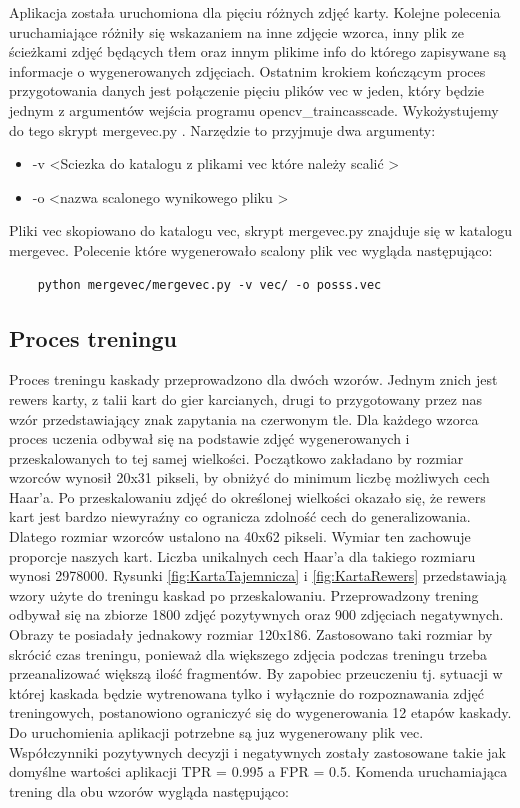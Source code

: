 \documentclass{article}
\numberwithin{equation}{section}
\begin{document}
Aplikacja została uruchomiona dla pięciu różnych zdjęć karty. Kolejne polecenia uruchamiające różniły się wskazaniem na inne zdjęcie wzorca, inny plik ze ścieżkami zdjęć będących tłem oraz innym plikime info do którego zapisywane są informacje o wygenerowanych zdjęciach.
Ostatnim krokiem kończącym proces przygotowania danych jest połączenie pięciu plików vec w jeden, który będzie jednym z argumentów wejścia programu opencv\_traincasscade. Wykożystujemy do tego skrypt mergevec.py \cite{mergeVec}. Narzędzie to przyjmuje dwa argumenty:
\begin{itemize}
    \item -v \textless Sciezka do katalogu z plikami vec które należy scalić \textgreater
    \item -o \textless nazwa scalonego wynikowego pliku \textgreater
\end{itemize}
Pliki vec skopiowano do katalogu vec, skrypt mergevec.py znajduje się w katalogu mergevec. Polecenie które wygenerowało scalony plik vec wygląda następująco: 
\begin{lstlisting}
    python mergevec/mergevec.py -v vec/ -o posss.vec
\end{lstlisting}
\subsection{Proces treningu}

Proces treningu kaskady przeprowadzono dla dwóch wzorów. Jednym znich jest rewers karty, z talii kart do gier karcianych, drugi to przygotowany przez nas wzór przedstawiający znak zapytania na czerwonym tle. Dla każdego wzorca proces uczenia odbywał się na podstawie zdjęć wygenerowanych i przeskalowanych to tej samej wielkości. Początkowo zakładano by rozmiar wzorców wynosił 20x31 pikseli, by obniżyć do minimum liczbę możliwych cech Haar'a.
Po przeskalowaniu zdjęć do określonej wielkości okazało się, że rewers kart jest bardzo niewyraźny co ogranicza zdolność cech do generalizowania. Dlatego rozmiar wzorców ustalono na 40x62 pikseli. Wymiar ten zachowuje proporcje naszych kart. Liczba unikalnych cech Haar'a dla takiego rozmiaru wynosi 2978000. Rysunki \ref{fig:KartaTajemnicza} i \ref{fig:KartaRewers} przedstawiają wzory użyte do treningu kaskad po przeskalowaniu. Przeprowadzony trening odbywał się na zbiorze 1800 zdjęć pozytywnych oraz 900 zdjęciach negatywnych. Obrazy te posiadały jednakowy rozmiar 120x186. Zastosowano taki rozmiar by skrócić czas treningu, ponieważ dla większego zdjęcia podczas treningu trzeba przeanalizować większą ilość fragmentów. By zapobiec przeuczeniu tj. sytuacji w której kaskada będzie wytrenowana tylko i wyłącznie do rozpoznawania zdjęć treningowych, postanowiono ograniczyć się do wygenerowania 12 etapów kaskady. Do uruchomienia aplikacji potrzebne są juz wygenerowany plik vec. Współczynniki pozytywnych decyzji i negatywnych zostały zastosowane takie jak domyślne wartości aplikacji TPR = 0.995 a FPR = 0.5. Komenda uruchamiająca trening dla obu wzorów wygląda następująco:
\end{document}
